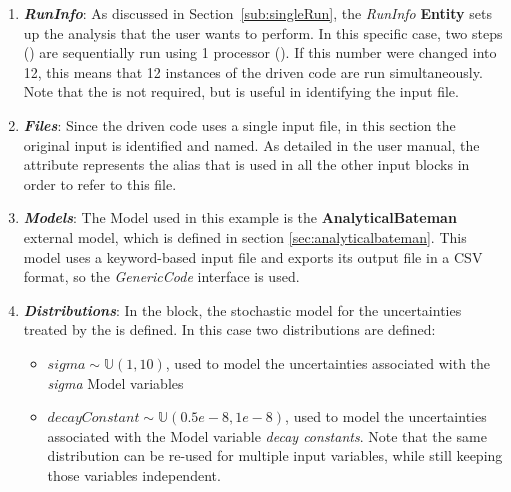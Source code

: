 \begin{enumerate}
   \item \textbf{\textit{RunInfo}}:
     As discussed in Section~\ref{sub:singleRun}, the \textit{RunInfo} \textbf{Entity} sets up the analysis
     that the user wants to perform. In this specific case, two steps () are sequentially run
     using 1 processor (). If this number were changed into 12, this means that
     12 instances of the driven code are run simultaneously. 
     Note that the  is not required, but is useful in identifying the input file.
   \item \textbf{\textit{Files}}:
     Since the driven code uses a single input file, in this section the original input is identified and
     named. As detailed in the user manual, the attribute  represents the alias that is used in
     all the other input blocks in order to refer to this file.
   \item \textbf{\textit{Models}}:
     The Model used in this example is the
     \textbf{AnalyticalBateman} external model, which is defined in section \ref{sec:analyticalbateman}.  This model uses a keyword-based input file
     and exports its output file in a CSV format, so the \textit{GenericCode} interface is used.
   \item \textbf{\textit{Distributions}}:
     In the  block, the stochastic model for the uncertainties treated by the
      is defined. In this case two distributions are defined:
     \begin{itemize}
      \item $sigma \sim \mathbb{U}(1,10)$, used to model the uncertainties
        associated with the \textit{sigma} Model variables
      \item  $decayConstant \sim \mathbb{U}(0.5e-8,1e-8)$,  used to
        model the uncertainties associated with the Model variable \textit{decay constants}.  Note that the
        same distribution can be re-used for multiple input variables, while still keeping those variables
        independent.
     \end{itemize}

\end{enumerate}
